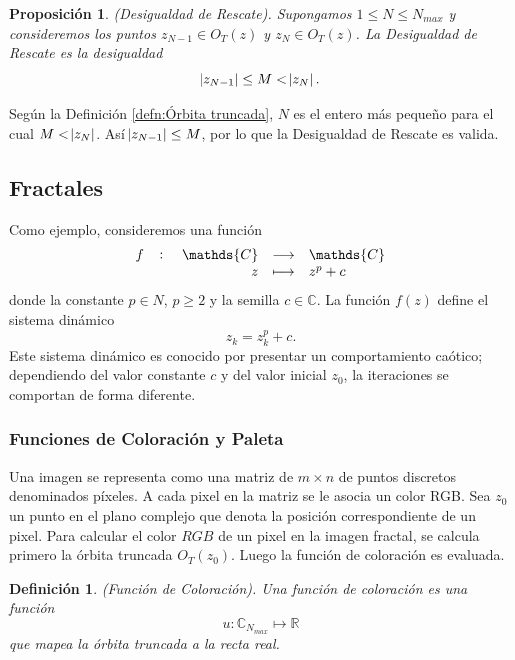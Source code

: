 \documentclass[12pt,letterpaper,final]{article}
\theoremstyle{plain}
\newtheorem{prop}{Proposición}[section]
\newtheorem{defn}{Definición}[section]
\theoremstyle{definition}
\theoremstyle{remark}
\numberwithin{equation}{section}
\begin{document}
\begin{prop} \label{prop:Desigualdad de Rescate}
(Desigualdad de Rescate). Supongamos $1\leq N\leq N_{max}$ y consideremos los puntos $z_{N-1}\in O_T(z)$ y $z_{N}\in O_T(z)$. La Desigualdad de Rescate es la desigualdad \begin{equation} \label{eq:Desigualdad de Rescate}
\abs{z_{N-1}} \leq M < \abs{z_N}.
\end{equation}
\end{prop}
Según la Definición \ref{defn:Órbita truncada}, $N$ es el entero más pequeño para el cual $M < \abs{z_N}$. Así $\abs{z_{N-1}} \leq M$, por lo que la Desigualdad de Rescate es valida.

\subsection{Fractales}
Como ejemplo, consideremos una función \begin{equation} \label{eq:Función Fractal}
\fullfunction{f}{\mathds{C}}{\mathds{C}}{z}{z^p+c}
\end{equation}
donde la constante $p\in N$, $p\geq 2$ y la semilla $c\in\mathds{C}$. La función $f(z)$ define el sistema dinámico \begin{equation} \label{eq:Sistema Dinámico}
z_k = z_k^p + c.
\end{equation}
Este sistema dinámico es conocido por presentar un comportamiento caótico; dependiendo del valor constante $c$ y del valor inicial $z_0$, la iteraciones se comportan de forma diferente.

\subsubsection{Funciones de Coloración y Paleta}
Una imagen se representa como una matriz de $m\times n$ de puntos discretos denominados píxeles. A cada pixel en la matriz se le asocia un color RGB. Sea $z_0$ un punto en el plano complejo que denota la posición correspondiente de un pixel. Para calcular el color $RGB$ de un pixel en la imagen fractal, se calcula primero la órbita truncada $O_T(z_0)$. Luego la función de coloración es evaluada.

\begin{defn}
(Función de Coloración). Una función de coloración es una función \begin{equation} \label{eq:Función de Coloración}
u:\mathds{C}_{N_{max}} \longmapsto \mathds{R}
\end{equation}
que mapea la órbita truncada a la recta real.
\end{defn}
\end{document}
